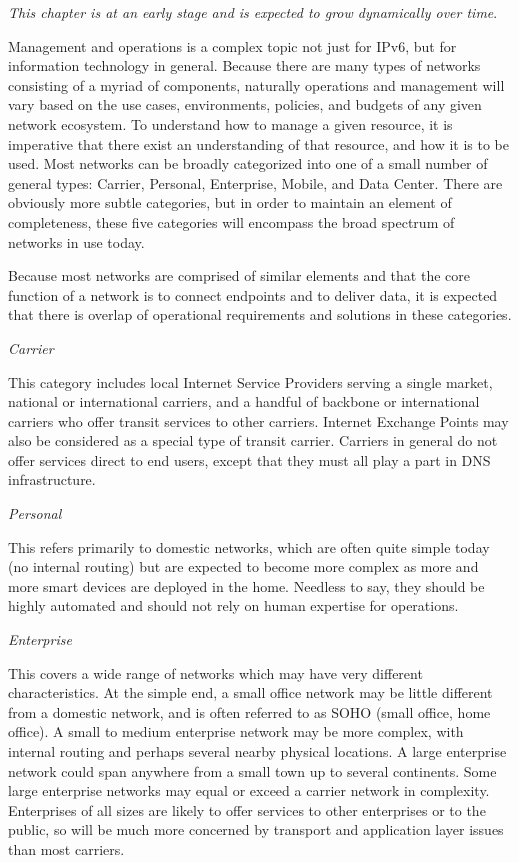 \documentclass[
]{article}
\begin{document}
\emph{This chapter is at an early stage and is expected to grow
dynamically over time}.

Management and operations is a complex topic not just for IPv6, but for
information technology in general. Because there are many types of
networks consisting of a myriad of components, naturally operations and
management will vary based on the use cases, environments, policies, and
budgets of any given network ecosystem. To understand how to manage a
given resource, it is imperative that there exist an understanding of
that resource, and how it is to be used. Most networks can be broadly
categorized into one of a small number of general types: Carrier,
Personal, Enterprise, Mobile, and Data Center. There are obviously more
subtle categories, but in order to maintain an element of completeness,
these five categories will encompass the broad spectrum of networks in
use today.

Because most networks are comprised of similar elements and that the
core function of a network is to connect endpoints and to deliver data,
it is expected that there is overlap of operational requirements and
solutions in these categories.

\emph{Carrier}

This category includes local Internet Service Providers serving a single
market, national or international carriers, and a handful of backbone or
international carriers who offer transit services to other carriers.
Internet Exchange Points may also be considered as a special type of
transit carrier. Carriers in general do not offer services direct to end
users, except that they must all play a part in DNS infrastructure.

\emph{Personal}

This refers primarily to domestic networks, which are often quite simple
today (no internal routing) but are expected to become more complex as
more and more smart devices are deployed in the home. Needless to say,
they should be highly automated and should not rely on human expertise
for operations.

\emph{Enterprise}

This covers a wide range of networks which may have very different
characteristics. At the simple end, a small office network may be little
different from a domestic network, and is often referred to as SOHO
(small office, home office). A small to medium enterprise network may be
more complex, with internal routing and perhaps several nearby physical
locations. A large enterprise network could span anywhere from a small
town up to several continents. Some large enterprise networks may equal
or exceed a carrier network in complexity. Enterprises of all sizes are
likely to offer services to other enterprises or to the public, so will
be much more concerned by transport and application layer issues than
most carriers.
\end{document}
